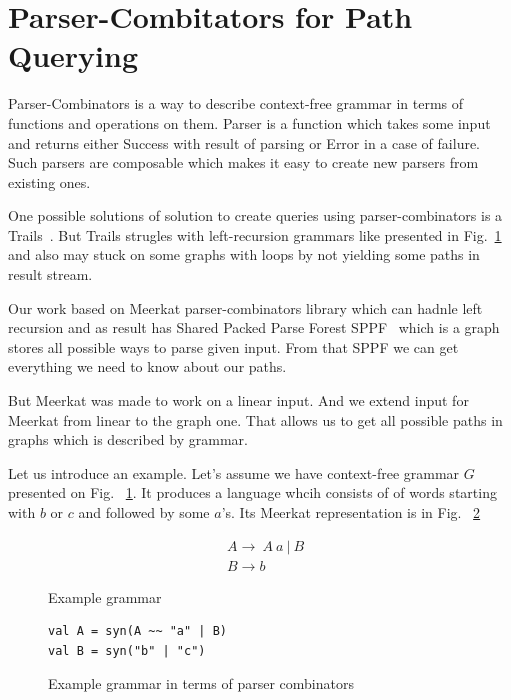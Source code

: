 \section{Parser-Combitators for Path Querying}

Parser-Combinators is a way to describe context-free grammar in terms of functions and operations on them. Parser is a function which takes some input and returns either Success with result of parsing or Error in a case of failure. Such parsers are composable which makes it easy to create new parsers from existing ones.

One possible solutions of solution to create queries using parser-combinators is a Trails~\cite{ScalaGraphParsing}. But Trails strugles with left-recursion grammars like presented in Fig.~\ref{fig:exampleGrammar} and also may stuck on some graphs with loops by not yielding some paths in result stream.

Our work based on Meerkat parser-combinators library which can hadnle left recursion and as result has Shared Packed Parse Forest SPPF~\cite{SPPF} which is a graph stores all possible ways to parse given input. From that SPPF we can get everything we need to know about our paths.

But Meerkat was made to work on a linear input. And we extend input for Meerkat from linear to the graph one. That allows us to get all possible paths in graphs which is described by grammar.

Let us introduce an example. Let's assume we have context-free grammar $G$ presented on Fig. ~\ref{fig:exampleGrammar}. It produces a language whcih consists of of words starting with $b$ or $c$ and followed by some $a$'s. Its Meerkat representation is in Fig. ~\ref{fig:exampleGrammarMeerkat}

\begin{figure}[h]
\begin{align*}
& A \rightarrow\ A\ a\ |\ B \\
& B \rightarrow b
\end{align*}
\caption{Example grammar}
\label{fig:exampleGrammar}
\end{figure}


\begin{figure}[h]
\begin{lstlisting}
val A = syn(A ~~ "a" | B)
val B = syn("b" | "c") 
\end{lstlisting}
\caption{Example grammar in terms of parser combinators}
\label{fig:exampleGrammarMeerkat}
\end{figure}

